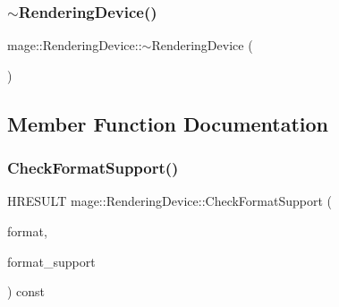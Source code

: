 \hypertarget{classmage_1_1_rendering_device_a17a00607a746fb6fed0ff76a8ce13dc2}{}\label{classmage_1_1_rendering_device_a17a00607a746fb6fed0ff76a8ce13dc2} 
\subsubsection{\texorpdfstring{$\sim$\+Rendering\+Device()}{~RenderingDevice()}}
{\footnotesize\ttfamily mage\+::\+Rendering\+Device\+::$\sim$\+Rendering\+Device (\begin{DoxyParamCaption}{ }\end{DoxyParamCaption})\hspace{0.3cm}{\ttfamily [default]}}



\subsection{Member Function Documentation}
\hypertarget{classmage_1_1_rendering_device_a23ae414e475b1de5d721ac5acd5e4545}{}\label{classmage_1_1_rendering_device_a23ae414e475b1de5d721ac5acd5e4545} 
\subsubsection{\texorpdfstring{Check\+Format\+Support()}{CheckFormatSupport()}}
{\footnotesize\ttfamily H\+R\+E\+S\+U\+LT mage\+::\+Rendering\+Device\+::\+Check\+Format\+Support (\begin{DoxyParamCaption}\item[{D\+X\+G\+I\+\_\+\+F\+O\+R\+M\+AT}]{format,  }\item[{U\+I\+NT $\ast$}]{format\+\_\+support }\end{DoxyParamCaption}) const}

\hypertarget{classmage_1_1_rendering_device_a45327af43c2af0bfced6bc02e038589a}{}\label{classmage_1_1_rendering_device_a45327af43c2af0bfced6bc02e038589a} 
